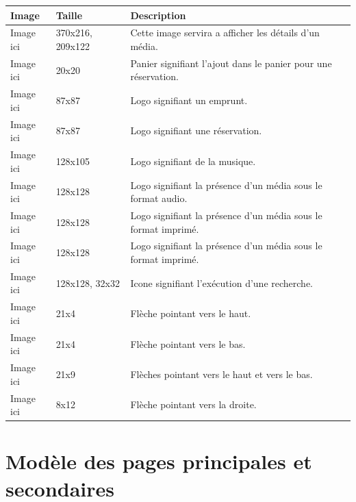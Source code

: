 \documentclass[letter, 10pt]{report}
\begin{document}
\begin{center}
	\begin{tabular}{|l|l|p{5cm}|}
	\hline
	Image 		& Taille 			& Description \\ \hline
	Image ici 	& 370x216, 209x122 	& Cette image servira a afficher les détails d'un média. \\ \hline
	Image ici 	& 20x20 			& Panier signifiant l'ajout dans le panier pour une réservation. \\ \hline
	Image ici 	& 87x87 			& Logo signifiant un emprunt. \\ \hline
	Image ici 	& 87x87 			& Logo signifiant une réservation. \\ \hline
	Image ici 	& 128x105 			& Logo signifiant de la musique. \\ \hline
	Image ici 	& 128x128 			& Logo signifiant la présence d'un média sous le format audio. \\ \hline
	Image ici 	& 128x128 			& Logo signifiant la présence d'un média sous le format imprimé. \\ \hline
	Image ici 	& 128x128 			& Logo signifiant la présence d'un média sous le format imprimé. \\ \hline
	Image ici 	& 128x128, 32x32 	& Icone signifiant l'exécution d'une recherche. \\ \hline
	Image ici 	& 21x4 				& Flèche pointant vers le haut. \\ \hline
	Image ici 	& 21x4 				& Flèche pointant vers le bas. \\ \hline
	Image ici 	& 21x9 				& Flèches pointant vers le haut et vers le bas. \\ \hline
	Image ici 	& 8x12 				& Flèche pointant vers la droite. \\ \hline
	\hline
	\end{tabular}
\end{center}

\section{Modèle des pages principales et secondaires}
\end{document}
